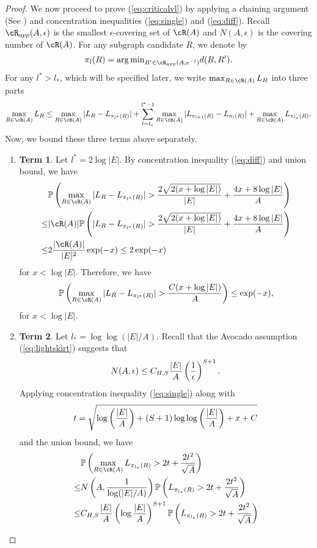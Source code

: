 \begin{proof}
We now proceed to prove (\ref{eq:criticalvl}) by applying a chaining argument (See \cite{talagrand2006generic}) and concentration inequalities (\ref{eq:single}) and (\ref{eq:diff}).
Recall $\cR_{app}(A,\epsilon)$ is the smallest $\epsilon$-covering set of $\cR(A)$ and $N(A,\epsilon)$ is the covering number of $\cR(A)$.
For any subgraph candidate $R$, we denote by
$$
\pi_l(R)={\arg\min}_{R'\in \cR_{app}(A,e^{-l})} d(R,R').
$$
For any $l^\ast>l_\ast$, which will be specified later, we write $\max_{R\in\cR(A)}L_R$ into three parts
$$
\max_{R\in\cR(A)}L_R\le \max_{R\in\cR(A)}|L_R-L_{\pi_{l^\ast}(R)}|+\sum_{l=l_\ast}^{l^\ast-1}\max_{R\in\cR(A)}|L_{\pi_{l+1}(R)}-L_{\pi_{l}(R)}|+\max_{R\in\cR(A)}L_{\pi_{l_\ast}(R)}.
$$
Now, we bound these three terms above separately.
\begin{enumerate}
\item[] \textbf{Term 1}. Let $l^\ast=2\log |E|$. By concentration inequality (\ref{eq:diff}) and union bound, we have 
\begin{align*}
& \PP\left(\max_{R\in\cR(A)}|L_R-L_{\pi_{l^\ast}(R)}|>{2\sqrt{2(x+\log|E|)}\over |E|}+{4x+8\log |E|\over A}\right)\\
\le & |\cR(A)| \PP\left(|L_R-L_{\pi_{l^\ast}(R)}|>{2\sqrt{2(x+\log|E|)}\over |E|}+{4x+8\log |E|\over A}\right)\\
\le & 2{|\cR(A)|\over |E|^2}\exp(-x)\le 2\exp(-x) 
\end{align*}
for $x<\log |E|$. Therefore, we have
$$
\PP\left(\max_{R\in\cR(A)}|L_R-L_{\pi_{l^\ast}(R)}|>{C(x+\log |E|)\over A}\right)\le \exp(-x),
$$
for $x<\log |E|$.
\item[] \textbf{Term 2}. Let $l_\ast=\log\log (|E|/A)$. 
Recall that the Avocado assumption (\ref{eq:lightskirt}) suggests that
\begin{equation}
\label{eq:cvnum}
N(A,\epsilon)\le C_{H,S}{|E|\over A}\left(1\over \epsilon\right)^{S+1}.
\end{equation}
Applying concentration inequality (\ref{eq:single}) along with
\begin{equation}
t=\sqrt{\log\left(|E|\over A\right)+(S+1)\log\log\left(|E|\over A\right)+x+C}
\end{equation}
and the union bound, we have 
\begin{align*}
&\PP\left(\max_{R\in\cR(A)}L_{\pi_{l_\ast}(R)}>2t+{2t^2\over \sqrt{A}}\right)\\
\le & N\left(A,{1\over \log (|E|/A)}\right) \PP\left(L_{\pi_{l_\ast}(R)}>2t+{2t^2\over \sqrt{A}}\right)\\
\le & C_{H,S}{|E|\over A}\left(\log {|E|\over A}\right)^{S+1} \PP\left(L_{\pi_{l_\ast}(R)}>2t+{2t^2\over \sqrt{A}}\right)\\

\end{align*}
\end{enumerate}
\end{proof}

